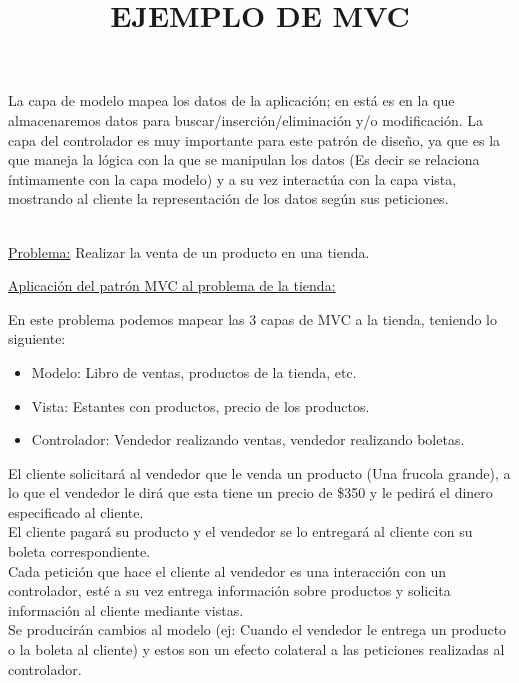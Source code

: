 \documentclass[a4paper,11pt]{report}
\begin{document}
 \newpage
La capa de modelo mapea los datos de la aplicación; en está es en la que almacenaremos datos para buscar/inserción/eliminación y/o modificación.
La capa del controlador es muy importante para este patrón de diseño, ya que es la
que maneja la lógica con la que se manipulan los datos (Es decir se relaciona íntimamente con
la capa modelo) y a su vez interactúa con la capa vista, mostrando al cliente la representación de los datos según sus peticiones.\\

\title {\textbf{ EJEMPLO DE MVC}}\\

\underline{Problema:} Realizar la venta de un producto en una tienda.

\underline{Aplicación del patrón MVC al problema de la tienda:}

En este problema podemos mapear las 3 capas de MVC a la tienda, teniendo lo siguiente:

\begin{itemize}
    \item{Modelo:} Libro de ventas, productos de la tienda, etc. 
    \item{Vista:} Estantes con productos, precio de los productos.
    \item{Controlador:} Vendedor realizando ventas, vendedor realizando boletas.
\end{itemize}

El cliente solicitará al vendedor que le venda un producto (Una frucola grande),
a lo que el vendedor le dirá que esta tiene un precio de \$350 y le pedirá el dinero especificado al cliente.\\
El cliente pagará su producto y el vendedor se lo entregará al cliente con su boleta correspondiente.\\
Cada petición que hace el cliente al vendedor es una interacción con
un controlador, esté a su vez entrega información sobre productos y solicita información al cliente mediante vistas.\\
Se producirán cambios al modelo (ej: Cuando el vendedor le entrega
un producto o la boleta al cliente) y estos son un efecto colateral a las peticiones realizadas al controlador.
\end{document}
